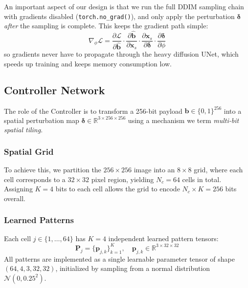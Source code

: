 \documentclass[conference]{IEEEtran}
\newcommand{\R}{\mathbb{R}}
\newcommand{\Lcal}{\mathcal{L}}
\newcommand{\Ncal}{\mathcal{N}}
\begin{document}
An important aspect of our design is that we run the full DDIM sampling chain with gradients disabled (\texttt{torch.no\_grad()}), and only apply the perturbation $\bm{\delta}$ \emph{after} the sampling is complete.
This keeps the gradient path simple:
\begin{equation}
    \nabla_\phi \Lcal = \frac{\partial \Lcal}{\partial \hat{\mathbf{b}}} \cdot \frac{\partial \hat{\mathbf{b}}}{\partial \mathbf{x}_s} \cdot \frac{\partial \mathbf{x}_s}{\partial \bm{\delta}} \cdot \frac{\partial \bm{\delta}}{\partial \phi}
    \label{eq:grad_path}
\end{equation}
so gradients never have to propagate through the heavy diffusion UNet, which speeds up training and keeps memory consumption low.

\subsection{Controller Network}
\label{sec:controller}

The role of the Controller is to transform a 256-bit payload $\mathbf{b} \in \{0,1\}^{256}$ into a spatial perturbation map $\bm{\delta} \in \R^{3 \times 256 \times 256}$ using a mechanism we term \emph{multi-bit spatial tiling}.

\subsubsection{Spatial Grid}
To achieve this, we partition the $256 \times 256$ image into an $8 \times 8$ grid, where each cell corresponds to a $32 \times 32$ pixel region, yielding $N_c = 64$ cells in total.
Assigning $K = 4$ bits to each cell allows the grid to encode $N_c \times K = 256$ bits overall.

\subsubsection{Learned Patterns}
Each cell $j \in \{1, \ldots, 64\}$ has $K = 4$ independent learned pattern tensors:
\begin{equation}
    \mathbf{P}_j = \{\mathbf{p}_{j,k}\}_{k=1}^{K}, \quad \mathbf{p}_{j,k} \in \R^{3 \times 32 \times 32}
    \label{eq:patterns}
\end{equation}
All patterns are implemented as a single learnable parameter tensor of shape $(64, 4, 3, 32, 32)$, initialized by sampling from a normal distribution $\Ncal(0, 0.25^2)$.
\end{document}

